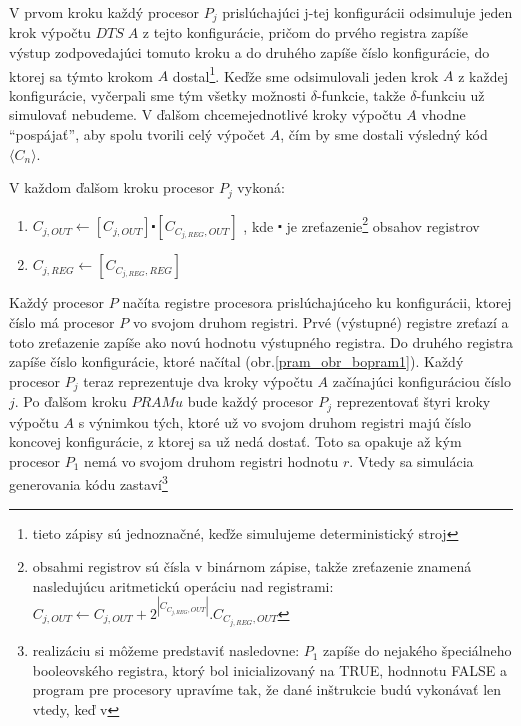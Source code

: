 \begin{dokaz}
\begin{itemize}
    V prvom kroku každý procesor $P_j$ prislúchajúci j-tej
    konfigurácii odsimuluje jeden krok výpočtu $DTS\; A$ z tejto
    konfigurácie, pričom do prvého registra zapíše výstup
    zodpovedajúci tomuto kroku a do druhého zapíše číslo
    konfigurácie, do ktorej sa týmto krokom $A$
    dostal\footnote{tieto zápisy sú jednoznačné, keďže simulujeme
    deterministický stroj}. Keďže sme odsimulovali jeden krok $A$
    z každej konfigurácie, vyčerpali sme tým všetky možnosti
    $\delta$-funkcie, takže $\delta$-funkciu už simulovať
    nebudeme. V ďalšom chceme\linebreak jednotlivé kroky výpočtu $A$ vhodne
    ``pospájať'', aby spolu tvorili celý výpočet $A$, čím by sme
    dostali výsledný kód $\langle C_n\rangle$.

    V každom ďalšom kroku procesor $P_j$ vykoná:
    \begin{enumerate}
      \item  $C_{j,OUT}\leftarrow [C_{j,OUT}]\centerdot
      [C_{C_{j,REG},OUT}]$       , kde $\centerdot$ je
      zreťazenie\footnote{obsahmi registrov sú čísla v binárnom
      zápise, takže zreťazenie znamená nasledujúcu aritmetickú
      operáciu nad registrami: $C_{j,OUT}\leftarrow C_{j,OUT} +
      2^{|C_{C_{j,REG},OUT}|}.C_{C_{j,REG},OUT}$} obsahov registrov
      \item $C_{j,REG}\leftarrow [C_{C_{j,REG},REG}]$
    \end{enumerate}
    Každý procesor $P$ načíta registre procesora
    prislúchajúceho ku konfigurácii, ktorej číslo má procesor $P$ vo
    svojom druhom registri. Prvé (výstupné) registre zreťazí a toto
    zreťazenie zapíše ako novú hodnotu výstupného registra. Do
    druhého registra zapíše číslo konfi\-gurácie, ktoré načítal
    (obr.\ref{pram_obr_bopram1}). Každý procesor $P_j$ teraz reprezentuje dva
    kroky výpočtu $A$ začínajúci konfiguráciou číslo $j$. Po ďalšom
    kroku $PRAMu$ bude každý procesor $P_j$ reprezentovať štyri kroky
    výpočtu $A$ s výnimkou tých, ktoré už vo svojom druhom registri
    majú číslo koncovej konfigurácie, z ktorej sa už nedá dostať.
    Toto sa opakuje až kým procesor $P_1$ nemá vo svojom druhom
    registri hodnotu $r$. Vtedy sa simulácia generovania
    kódu\linebreak
    zastaví\footnote{realizáciu si môžeme predstaviť nasledovne:
    $P_1$ zapíše do nejakého špeciálneho booleovského registra, ktorý
    bol inicializovaný na TRUE, hodnnotu FALSE a program pre procesory
    upravíme tak, že dané inštrukcie budú vykonávať len vtedy, keď v
}
\end{itemize}
\end{dokaz}
